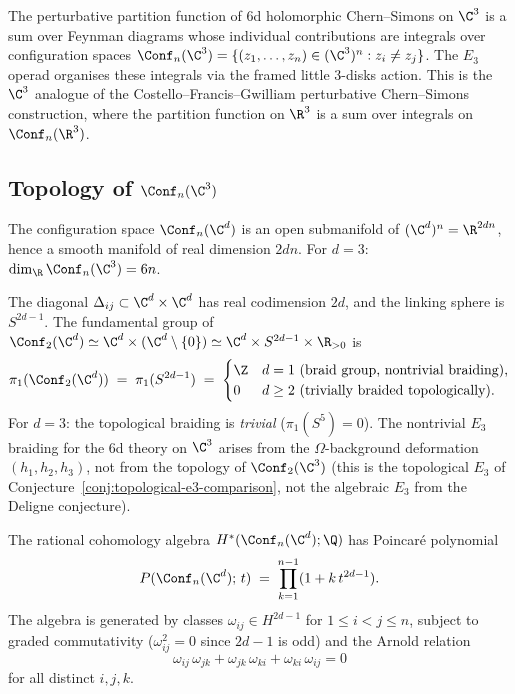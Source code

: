 The perturbative partition function of $6$d holomorphic Chern--Simons on $\C^3$ is a sum over Feynman diagrams whose individual contributions are integrals over configuration spaces $\Conf_n(\C^3) = \{(z_1, \ldots, z_n) \in (\C^3)^n : z_i \neq z_j\}$. The $E_3$ operad organises these integrals via the framed little $3$-disks action. This is the $\C^3$ analogue of the Costello--Francis--Gwilliam perturbative Chern--Simons construction, where the partition function on $\R^3$ is a sum over integrals on $\Conf_n(\R^3)$.

\subsection{Topology of \texorpdfstring{$\Conf_n(\C^3)$}{Conf-n(C-3)}}
\label{subsec:conf-topology-c3}

The configuration space $\Conf_n(\C^d)$ is an open submanifold of $(\C^d)^n = \R^{2dn}$, hence a smooth manifold of real dimension $2dn$. For $d = 3$: $\dim_\R \Conf_n(\C^3) = 6n$.

The diagonal $\Delta_{ij} \subset \C^d \times \C^d$ has real codimension $2d$, and the linking sphere is $S^{2d-1}$. The fundamental group of $\Conf_2(\C^d) \simeq \C^d \times (\C^d \setminus \{0\}) \simeq \C^d \times S^{2d-1} \times \R_{>0}$ is
\[
 \pi_1(\Conf_2(\C^d)) \;=\; \pi_1(S^{2d-1}) \;=\;
 \begin{cases}
 \Z & d = 1 \text{ (braid group, nontrivial braiding),} \\
 0 & d \geq 2 \text{ (trivially braided topologically).}
 \end{cases}
\]
For $d = 3$: the topological braiding is \emph{trivial} ($\pi_1(S^5) = 0$). The nontrivial $E_3$ braiding for the $6$d theory on $\C^3$ arises from the $\Omega$-background deformation $(h_1, h_2, h_3)$, not from the topology of $\Conf_2(\C^3)$ (this is the topological $E_3$ of Conjecture~\ref{conj:topological-e3-comparison}, not the algebraic $E_3$ from the Deligne conjecture).

\begin{proposition}
\label{prop:cohomology-conf-n-cd}
The rational cohomology algebra $H^*(\Conf_n(\C^d); \Q)$ has Poincar\'{e} polynomial
\begin{equation}\label{eq:poincare-conf-n}
 P(\Conf_n(\C^d);\, t)
 \;=\;
 \prod_{k=1}^{n-1} (1 + k\, t^{2d-1}).
\end{equation}
The algebra is generated by classes $\omega_{ij} \in H^{2d-1}$ for $1 \leq i < j \leq n$, subject to graded commutativity ($\omega_{ij}^2 = 0$ since $2d - 1$ is odd) and the Arnold relation
\begin{equation}\label{eq:arnold-c3}
 \omega_{ij}\, \omega_{jk} + \omega_{jk}\, \omega_{ki} + \omega_{ki}\, \omega_{ij} = 0
\end{equation}
for all distinct $i, j, k$.
\end{proposition}

